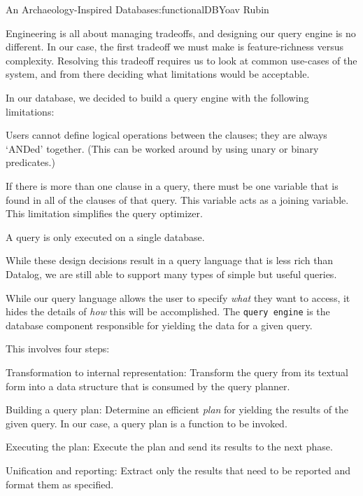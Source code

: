 \begin{aosachapter}{An Archaeology-Inspired Database}{s:functionalDB}{Yoav Rubin}
\label{limitations-of-our-query-language}

Engineering is all about managing tradeoffs, and designing our query
engine is no different. In our case, the first tradeoff we must make is
feature-richness versus complexity. Resolving this tradeoff requires us
to look at common use-cases of the system, and from there deciding what
limitations would be acceptable.

In our database, we decided to build a query engine with the following
limitations:

\begin{aosaitemize}

\item
  Users cannot define logical operations between the clauses; they are
  always `ANDed' together. (This can be worked around by using unary or
  binary predicates.)
\item
  If there is more than one clause in a query, there must be one
  variable that is found in all of the clauses of that query. This
  variable acts as a joining variable. This limitation simplifies the
  query optimizer.
\item
  A query is only executed on a single database.
\end{aosaitemize}

While these design decisions result in a query language that is less
rich than Datalog, we are still able to support many types of simple but
useful queries.

\label{query-engine-design}

While our query language allows the user to specify \emph{what} they
want to access, it hides the details of \emph{how} this will be
accomplished. The \texttt{query engine} is the database component
responsible for yielding the data for a given query.

This involves four steps:

\begin{aosaenumerate}
\def\labelenumi{\arabic{enumi}.}

\item
  Transformation to internal representation: Transform the query from
  its textual form into a data structure that is consumed by the query
  planner.
\item
  Building a query plan: Determine an efficient \emph{plan} for yielding
  the results of the given query. In our case, a query plan is a
  function to be invoked.
\item
  Executing the plan: Execute the plan and send its results to the next
  phase.
\item
  Unification and reporting: Extract only the results that need to be
  reported and format them as specified.
\end{aosaenumerate}


\end{aosachapter}
